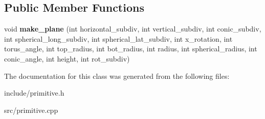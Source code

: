 \subsection*{Public Member Functions}
\begin{DoxyCompactItemize}
\item 
\mbox{\label{classplane_acc9f6a598cf1ea430521388697825229}} 
void {\bfseries make\+\_\+plane} (int horizontal\+\_\+subdiv, int vertical\+\_\+subdiv, int conic\+\_\+subdiv, int spherical\+\_\+long\+\_\+subdiv, int spherical\+\_\+lat\+\_\+subdiv, int x\+\_\+rotation, int torus\+\_\+angle, int top\+\_\+radius, int bot\+\_\+radius, int radius, int spherical\+\_\+radius, int conic\+\_\+angle, int height, int rot\+\_\+subdiv)
\end{DoxyCompactItemize}


The documentation for this class was generated from the following files\+:\begin{DoxyCompactItemize}
\item 
include/primitive.\+h\item 
src/primitive.\+cpp\end{DoxyCompactItemize}
